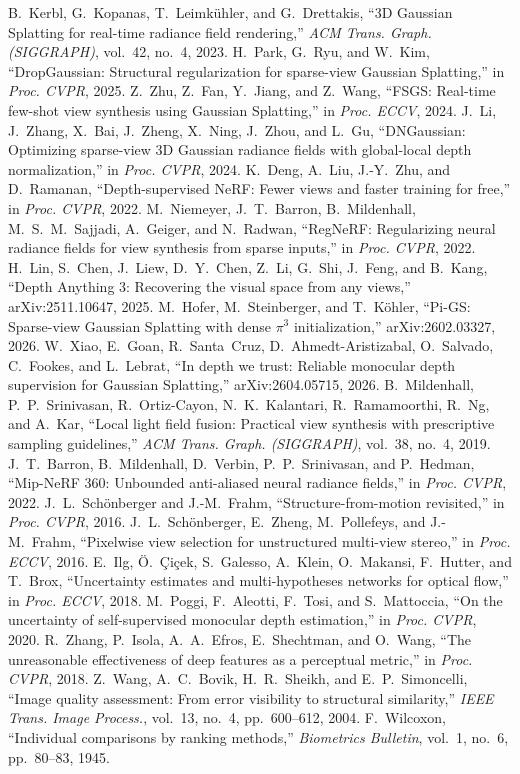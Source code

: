  B.~Kerbl, G.~Kopanas, T.~Leimk\"uhler, and G.~Drettakis, ``3D Gaussian Splatting for real-time radiance field rendering,'' \emph{ACM Trans. Graph. (SIGGRAPH)}, vol.~42, no.~4, 2023.
 H.~Park, G.~Ryu, and W.~Kim, ``DropGaussian: Structural regularization for sparse-view Gaussian Splatting,'' in \emph{Proc. CVPR}, 2025.
 Z.~Zhu, Z.~Fan, Y.~Jiang, and Z.~Wang, ``FSGS: Real-time few-shot view synthesis using Gaussian Splatting,'' in \emph{Proc. ECCV}, 2024.
 J.~Li, J.~Zhang, X.~Bai, J.~Zheng, X.~Ning, J.~Zhou, and L.~Gu, ``DNGaussian: Optimizing sparse-view 3D Gaussian radiance fields with global-local depth normalization,'' in \emph{Proc. CVPR}, 2024.
 K.~Deng, A.~Liu, J.-Y.~Zhu, and D.~Ramanan, ``Depth-supervised NeRF: Fewer views and faster training for free,'' in \emph{Proc. CVPR}, 2022.
 M.~Niemeyer, J.~T.~Barron, B.~Mildenhall, M.~S.~M.~Sajjadi, A.~Geiger, and N.~Radwan, ``RegNeRF: Regularizing neural radiance fields for view synthesis from sparse inputs,'' in \emph{Proc. CVPR}, 2022.
 H.~Lin, S.~Chen, J.~Liew, D.~Y.~Chen, Z.~Li, G.~Shi, J.~Feng, and B.~Kang, ``Depth Anything 3: Recovering the visual space from any views,'' arXiv:2511.10647, 2025.
 M.~Hofer, M.~Steinberger, and T.~K\"ohler, ``Pi-GS: Sparse-view Gaussian Splatting with dense $\pi^3$ initialization,'' arXiv:2602.03327, 2026.
 W.~Xiao, E.~Goan, R.~Santa~Cruz, D.~Ahmedt-Aristizabal, O.~Salvado, C.~Fookes, and L.~Lebrat, ``In depth we trust: Reliable monocular depth supervision for Gaussian Splatting,'' arXiv:2604.05715, 2026.
 B.~Mildenhall, P.~P.~Srinivasan, R.~Ortiz-Cayon, N.~K.~Kalantari, R.~Ramamoorthi, R.~Ng, and A.~Kar, ``Local light field fusion: Practical view synthesis with prescriptive sampling guidelines,'' \emph{ACM Trans. Graph. (SIGGRAPH)}, vol.~38, no.~4, 2019.
 J.~T.~Barron, B.~Mildenhall, D.~Verbin, P.~P.~Srinivasan, and P.~Hedman, ``Mip-NeRF 360: Unbounded anti-aliased neural radiance fields,'' in \emph{Proc. CVPR}, 2022.
 J.~L.~Sch\"onberger and J.-M.~Frahm, ``Structure-from-motion revisited,'' in \emph{Proc. CVPR}, 2016.
 J.~L.~Sch\"onberger, E.~Zheng, M.~Pollefeys, and J.-M.~Frahm, ``Pixelwise view selection for unstructured multi-view stereo,'' in \emph{Proc. ECCV}, 2016.
 E.~Ilg, \"O.~\c{C}i\c{c}ek, S.~Galesso, A.~Klein, O.~Makansi, F.~Hutter, and T.~Brox, ``Uncertainty estimates and multi-hypotheses networks for optical flow,'' in \emph{Proc. ECCV}, 2018.
 M.~Poggi, F.~Aleotti, F.~Tosi, and S.~Mattoccia, ``On the uncertainty of self-supervised monocular depth estimation,'' in \emph{Proc. CVPR}, 2020.
 R.~Zhang, P.~Isola, A.~A.~Efros, E.~Shechtman, and O.~Wang, ``The unreasonable effectiveness of deep features as a perceptual metric,'' in \emph{Proc. CVPR}, 2018.
 Z.~Wang, A.~C.~Bovik, H.~R.~Sheikh, and E.~P.~Simoncelli, ``Image quality assessment: From error visibility to structural similarity,'' \emph{IEEE Trans. Image Process.}, vol.~13, no.~4, pp.~600--612, 2004.
 F.~Wilcoxon, ``Individual comparisons by ranking methods,'' \emph{Biometrics Bulletin}, vol.~1, no.~6, pp.~80--83, 1945.
